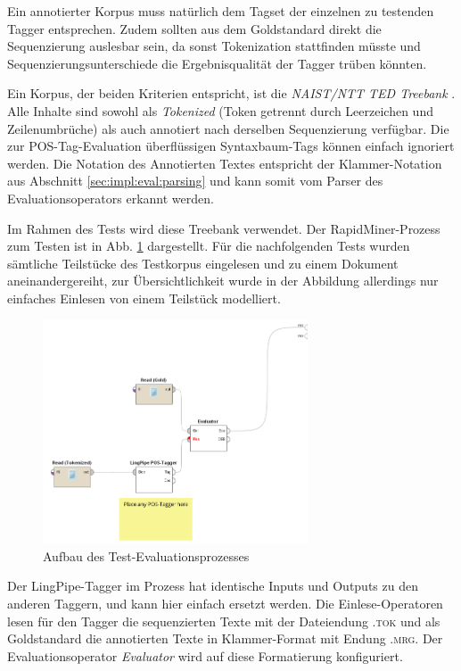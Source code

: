 Ein annotierter Korpus muss natürlich dem Tagset der einzelnen zu testenden Tagger entsprechen. Zudem sollten aus dem Goldstandard direkt die Sequenzierung auslesbar sein, da sonst Tokenization stattfinden müsste und Sequenzierungsunterschiede die Ergebnisqualität der Tagger trüben könnten.

Ein Korpus, der beiden Kriterien entspricht, ist die \textit{NAIST/NTT TED Treebank} \cite{tedbank}. Alle Inhalte sind sowohl als \textit{Tokenized} (Token getrennt durch Leerzeichen und Zeilenumbrüche) als auch annotiert nach derselben Sequenzierung verfügbar. Die zur POS-Tag-Evaluation überflüssigen Syntaxbaum-Tags können einfach ignoriert werden. Die Notation des Annotierten Textes entspricht der Klammer-Notation  aus Abschnitt \ref{sec:impl:eval:parsing} und kann somit vom Parser des Evaluationsoperators erkannt werden.

Im Rahmen des Tests wird diese Treebank verwendet. Der RapidMiner-Prozess zum Testen ist in Abb. \ref{fig:eval:corpus:process} dargestellt. Für die nachfolgenden Tests wurden sämtliche Teilstücke des Testkorpus eingelesen und zu einem Dokument aneinandergereiht, zur Übersichtlichkeit wurde in der Abbildung allerdings nur einfaches Einlesen von einem Teilstück modelliert. 

\begin{figure}[htb]
	\centering
	\captionsetup{justification=centering,margin=2cm}
	\includegraphics[width=0.7\textwidth]{gfx/process.png}
	
	\caption{Aufbau des Test-Evaluationsprozesses} 
	\label{fig:eval:corpus:process}
\end{figure}

Der LingPipe-Tagger im Prozess hat identische Inputs und Outputs zu den anderen Taggern, und kann hier einfach ersetzt werden. Die Einlese-Operatoren lesen für den Tagger die sequenzierten Texte mit der Dateiendung \textsc{.tok} und als Goldstandard die annotierten Texte in Klammer-Format mit Endung \textsc{.mrg}. Der Evaluationsoperator \textit{Evaluator} wird auf diese Formatierung konfiguriert.

